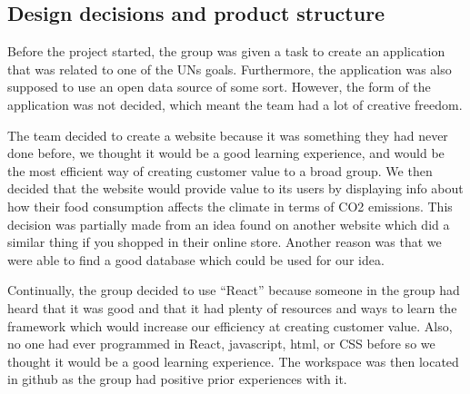 \subsection{Design decisions and product structure}

Before the project started, the group was given a task to create an application that was related to one of the UNs goals. Furthermore, the application was also supposed to use an open data source of some sort. However, the form of the application was not decided, which meant the team had a lot of creative freedom. 

The team decided to create a website because it was something they had never done before, we thought it would be a good learning experience, and would be the most efficient way of creating customer value to a broad group. We then decided that the website would provide value to its users by displaying info about how their food consumption affects the climate in terms of CO2 emissions. This decision was partially made from an idea found on another website which did a similar thing if you shopped in their online store. Another reason was that we were able to find a good database which could be used for our idea.

Continually, the group decided to use “React” because someone in the group had heard that it was good and that it had plenty of resources and ways to learn the framework which would increase our efficiency at creating customer value. Also, no one had ever programmed in React, javascript, html, or CSS before so we thought it would be a good learning experience. The workspace was then located in github as the group had positive prior experiences with it.


